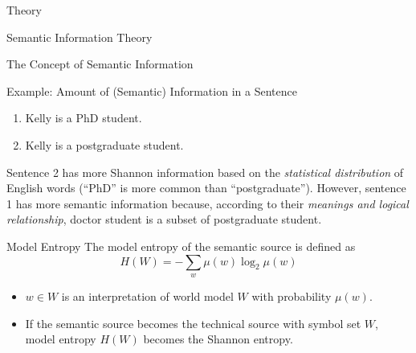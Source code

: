 \documentclass[presentation,mathserif,9pt]{beamer}
\begin{document}
\begin{section}{Theory}
\begin{subsection}{Semantic Information Theory}
\begin{frame}{The Concept of Semantic Information}
			\begin{exampleblock}{Example: Amount of (Semantic) Information in a Sentence}
				\vspace{0.1cm}
				\begin{enumerate}
					\item Kelly is a PhD student.
					\item Kelly is a postgraduate student.
				\end{enumerate}
				\vspace{0.1cm}
				\small{Sentence 2 has more Shannon information based on the \emph{statistical distribution} of English words (``PhD'' is more common than ``postgraduate''). However, sentence 1 has more semantic information because, according to their \emph{meanings and logical relationship}, doctor student is a subset of postgraduate student.}
			\end{exampleblock}
		\end{frame}

		\begin{frame}{Model Entropy}
			The {\color{blue} model entropy} of the semantic source is defined as
			\begin{equation}
				H(W) = - \sum_{w} \mu(w) \log_2 \mu(w)
			\end{equation}
			\vspace{-0.3cm}
			\begin{itemize}
				\item $w \in W$ is an interpretation of world model $W$ with probability $\mu(w)$.
				\item If the semantic source becomes the technical source with symbol set $W$, model entropy $H(W)$ becomes the Shannon entropy.
			\end{itemize}
		\end{frame}


\end{subsection}
\end{section}
\end{document}
